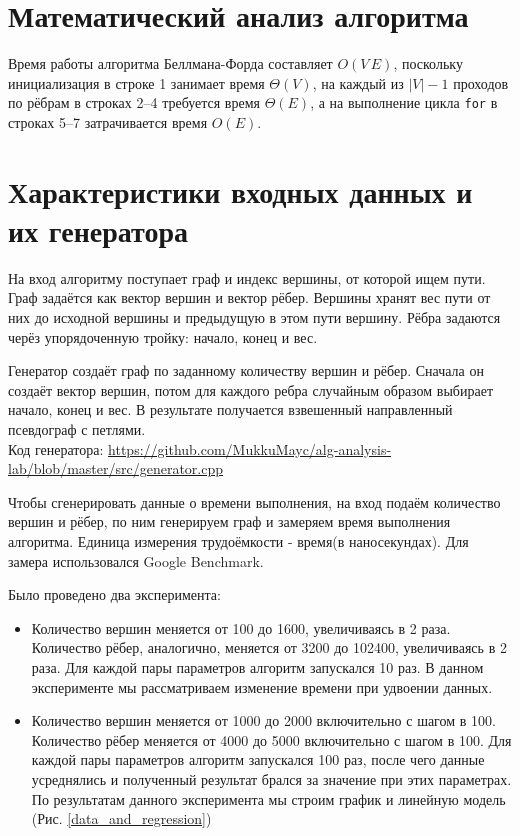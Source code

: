\documentclass[a4paper,12pt]{article}
\begin{document}
\section{Математический анализ алгоритма}
  Время работы алгоритма Беллмана-Форда составляет $O(V\,E)$, поскольку
  инициализация в строке 1 занимает время $\Theta(V)$, на каждый из $|V| - 1$ 
  проходов по рёбрам в строках 2--4 требуется время $\Theta(E)$, а на выполнение цикла
  \texttt{for} в строках 5--7 затрачивается время $O(E)$.\cite[с.~689-690]{cormen}

\section{Характеристики входных данных и их генератора}
На вход алгоритму поступает граф и индекс вершины, от которой ищем пути.
Граф задаётся как вектор вершин и вектор рёбер.
Вершины хранят вес пути от них до исходной вершины и предыдущую в этом пути вершину.
Рёбра задаются черёз упорядоченную тройку: начало, конец и вес.

Генератор создаёт граф по заданному количеству вершин и рёбер.
Сначала он создаёт вектор вершин, потом для каждого ребра случайным образом 
выбирает начало, конец и вес.
В результате получается взвешенный направленный псевдограф с петлями. \\
Код генератора: \url{https://github.com/MukkuMayc/alg-analysis-lab/blob/master/src/generator.cpp}

Чтобы сгенерировать данные о времени выполнения, 
на вход подаём количество вершин и рёбер, по ним генерируем граф 
и замеряем время выполнения алгоритма.
Единица измерения трудоёмкости - время(в наносекундах). Для замера использовался Google Benchmark.

Было проведено два эксперимента:
\begin{itemize}
  \item Количество вершин меняется от 100 до 1600, увеличиваясь в 2 раза.
  Количество рёбер, аналогично, меняется от 3200 до 102400, увеличиваясь в 2 раза.
  Для каждой пары параметров алгоритм запускался 10 раз.
  В данном эксперименте мы рассматриваем изменение времени при удвоении данных.
  \item 
  Количество вершин меняется от 1000 до 2000 включительно с шагом в 100.
  Количество рёбер меняется от 4000 до 5000 включительно с шагом в 100.
  Для каждой пары параметров алгоритм запускался 100 раз,
  после чего данные усреднялись и полученный результат брался за
  значение при этих параметрах.
  По результатам данного эксперимента мы строим график и линейную модель (Рис. \ref{data_and_regression})
\end{itemize}
\end{document}
